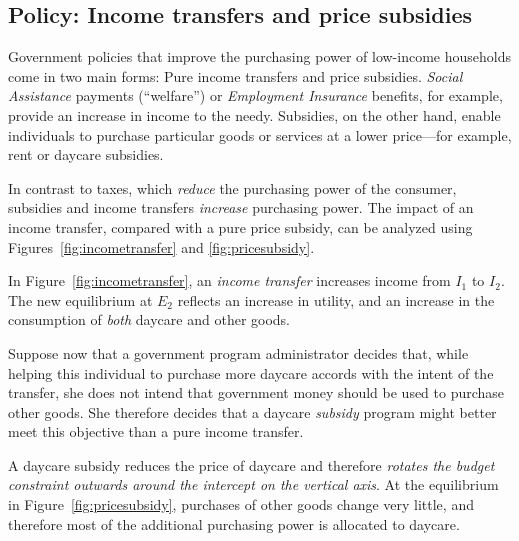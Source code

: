 \newhtmlpage

\subsection*{Policy: Income transfers and price subsidies}

Government policies that improve the purchasing power of low-income
households come in two main forms: Pure income transfers and price
subsidies. \textit{Social Assistance} payments (``welfare'') or 
\textit{Employment Insurance} benefits, for example, provide an increase in income
to the needy. Subsidies, on the other hand, enable individuals to purchase
particular goods or services at a lower price---for example, rent or daycare
subsidies.

In contrast to taxes, which \textit{reduce} the purchasing power of the
consumer, subsidies and income transfers \textit{increase} purchasing power.
The impact of an income transfer, compared with a pure price subsidy, can be
analyzed using Figures~\ref{fig:incometransfer} and \ref{fig:pricesubsidy}.



\newhtmlpage

In Figure~\ref{fig:incometransfer}, an \textit{income transfer} increases
income from $I_1$ to $I_2$. The new equilibrium at $E_2$ reflects an
increase in utility, and an increase in the consumption of \textit{both}
daycare and other goods.

Suppose now that a government program administrator decides that, while
helping this individual to purchase more daycare accords with the intent of
the transfer, she does not intend that government money should be used to
purchase other goods. She therefore decides that a daycare \textit{subsidy}
program might better meet this objective than a pure income transfer.

A daycare subsidy reduces the price of daycare and therefore \textit{rotates
	the budget constraint outwards around the intercept on the vertical axis}.
At the equilibrium in Figure~\ref{fig:pricesubsidy}, purchases of other
goods change very little, and therefore most of the additional purchasing
power is allocated to daycare.



\newhtmlpage

